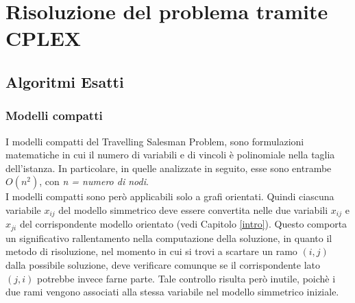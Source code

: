 \chapter{Risoluzione del problema tramite CPLEX}\label{CPLEX} 
\section{Algoritmi Esatti}
\subsection{Modelli compatti}
I modelli compatti del Travelling Salesman Problem, sono formulazioni matematiche in cui il numero di variabili e di vincoli è polinomiale nella taglia dell'istanza. In particolare, in quelle analizzate in seguito, esse sono entrambe $O(n^2)$, con \textit{n = numero di nodi}.\\
I modelli compatti sono però applicabili solo a grafi orientati. Quindi ciascuna variabile $x_{ij}$ del modello simmetrico deve essere convertita nelle due variabili $x_{ij}$ e $x_{ji}$ del corrispondente modello orientato (vedi Capitolo \ref{intro}). Questo comporta un significativo rallentamento nella computazione della soluzione, in quanto il metodo di risoluzione, nel momento in cui si trovi a scartare un ramo $(i,j)$ dalla possibile soluzione, deve verificare comunque se il corrispondente lato $(j,i)$ potrebbe invece farne parte. Tale controllo risulta però inutile, poichè i due rami vengono associati alla stessa variabile nel modello simmetrico iniziale.
